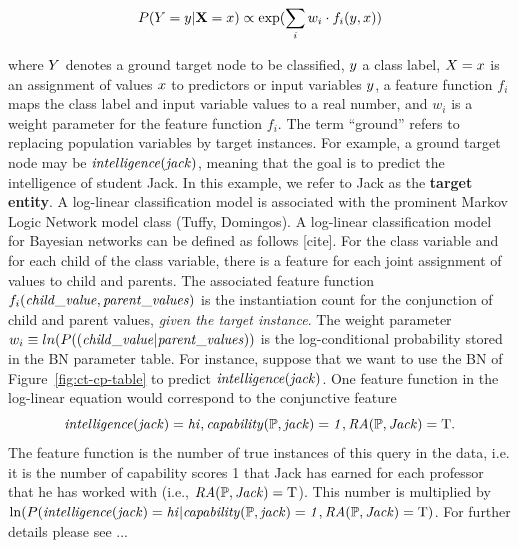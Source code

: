 \documentclass{acm_proc_article-sp}
\begin{document}
$$P(Y = y|\mathbf{X} = x) \propto \exp(\sum_{i} w_{i} \cdot f_{i}(y,x))  $$

where $Y$ denotes a ground target node to be classified, $y$ a class label, $X = x$ is an assignment of values $x$ to predictors or input variables $y$, a feature function $f_{i}$ maps the class label and input variable values to a real number, and $w_{i}$ is a weight parameter for the feature function $f_{i}$. The term ``ground'' refers to replacing population variables by target instances. For example, a ground target node may be $\it{intelligence}(jack)$, meaning that the goal is to predict the intelligence of student Jack. In this example, we refer to Jack as the \textbf{target entity}. A log-linear classification model is associated with the prominent Markov Logic Network model class (Tuffy, Domingos). A log-linear classification model for Bayesian networks can be defined as follows [cite]. For the class variable and for each child of the class variable, there is a feature for each joint assignment of values to child and parents. The associated feature function $f_{i}(\it{child\_value},\it{parent\_values})$ is the instantiation count for the conjunction of child and parent values, {\em given the target instance}. The weight parameter $w_{i} \equiv ln(P((\it{child\_value}|\it{parent\_values}))$ is the log-conditional probability stored in the BN parameter table. For instance, suppose that we want to use the BN of Figure~\ref{fig:ct-cp-table} to predict $\it{intelligence}(jack)$. One feature function in the log-linear equation would correspond to the conjunctive feature $$\it{intelligence}(jack) = hi,\it{capability}(\mathbb{P},jack) = 1, \it{RA}(\mathbb{P},Jack) = \mathrm{T}.$$ The feature function is the number of true instances of this query in the data, i.e. it is the number of capability scores 1 that Jack has earned for each professor that he has worked with (i.e., $\it{RA}(\mathbb{P},Jack) = \mathrm{T}$). This number is multiplied by $\ln(P(\it{intelligence}(jack) = hi|\it{capability}(\mathbb{P},jack) = 1, \it{RA}(\mathbb{P},Jack) = \mathrm{T})$. For further details please see ...
\end{document}
